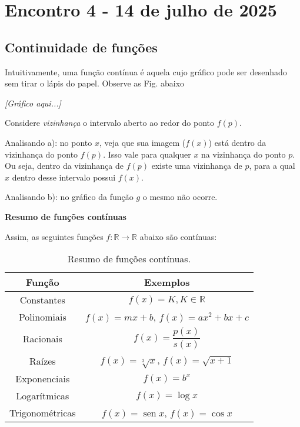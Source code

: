 \documentclass[12pt,openright,twoside,a4paper]{article}
\theoremstyle{definition}
\renewcommand{\sin}{\operatorname{sen}} %
\begin{document}
	\pagebreak
	
	\section{Encontro 4 - 14 de julho de 2025}
	
	\subsection{Continuidade de funções}
	
	Intuitivamente, uma função contínua é aquela cujo gráfico pode ser desenhado sem tirar o lápis do papel. Observe as Fig. abaixo
	
	\textit{[Gráfico aqui...]}
	
	Considere \textit{vizinhança }o intervalo aberto ao redor do ponto $f(p)$. 
	
	Analisando a): no ponto $x$, veja que sua imagem ($f(x)$) está dentro da vizinhança do ponto $f(p)$. Isso vale para qualquer $x$ na vizinhança do ponto $p$. Ou seja, dentro da vizinhança de $f(p)$ existe uma vizinhança de $p$, para a qual $x$ dentro desse intervalo possui $f(x)$.
	
	Analisando b): no gráfico da função $g$ o mesmo não ocorre.
	
		\textbf{Resumo de funções contínuas}
	
		Assim, as seguintes funções $f: \mathbb{R} \longrightarrow \mathbb{R}$ abaixo são contínuas:
		
		\begin{table}[h]
			\caption{Resumo de funções contínuas.}
			\centering
			\begin{tabular}[t]{|c|c|}
				\hline
				Função & Exemplos \\
				\hline
				Constantes & $f(x) = K, K \in \mathbb{R}$ \\
				\hline
				Polinomiais & $f(x) = mx + b$, $f(x) = ax^2 + bx + c$\\
				\hline
				Racionais & $f(x) = \dfrac{p(x)}{s(x)}$\\
				\hline
				Raízes & $f(x) = \sqrt[3]{x}$, $f(x) = \sqrt{x+1}$\\
				\hline
				Exponenciais & $f(x) = b^x$\\
				\hline
				Logarítmicas & $f(x) = \log x$\\
				\hline
				Trigonométricas & $f(x) = \sin x $, $f(x) = \cos x$\\
				\hline
			\end{tabular}
		\end{table}
	
\end{document}
